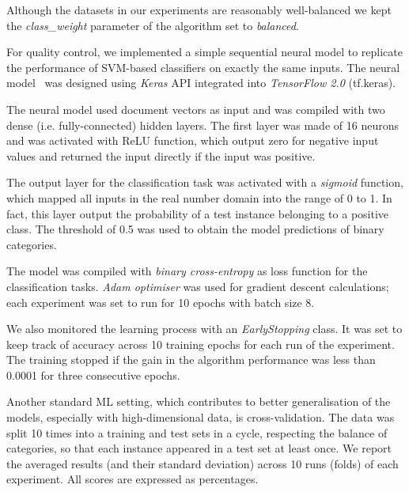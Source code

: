 Although the datasets in our experiments are reasonably well-balanced we kept the \textit{class\_weight} parameter of the algorithm set to \textit{balanced}. 

For quality control, we implemented a simple sequential neural model to replicate the performance of SVM-based classifiers on exactly the same inputs. The neural model~\label{pg:neural} was designed using \textit{Keras} \gls{API} integrated into \textit{TensorFlow 2.0} (tf.keras).  

The neural model used document vectors as input and was compiled with two dense (i.e. fully-connected) hidden layers. The first layer was  made of 16 neurons and was activated with \gls{ReLU} function, which output zero for negative input values and returned the input directly if the input was positive. 

The output layer for the classification task was activated with a \textit{sigmoid} function, which mapped all inputs in the real number domain into the range of 0 to 1. %
In fact, this layer output the probability of a test instance belonging to a positive class. The threshold of 0.5 was used to obtain the model predictions of binary categories. 


The model was compiled with \textit{binary cross-entropy} as loss function for the classification tasks. \textit{Adam optimiser} was used for gradient descent calculations; each experiment was set to run for 10 epochs with batch size 8.

We also monitored the learning process with an \textit{EarlyStopping} class. It was set to keep track of accuracy across 10 training epochs for each run of the experiment. The training stopped if the gain in the algorithm performance was less than 0.0001 for three consecutive epochs. 

Another standard ML setting, which contributes to better generalisation of the models, especially with high-dimensional data, is cross-validation. 
The data was split 10 times into a training and test sets in a cycle, respecting the balance of categories, so that each instance appeared in a test set at least once. We report the averaged results (and their standard deviation) across 10 runs (folds) of each experiment. All scores are expressed as percentages. 

